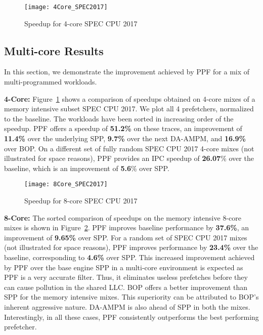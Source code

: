 \begin{figure}[ht]
\texttt{[image: 4Core\_SPEC2017]}
\caption{Speedup for 4-core SPEC CPU 2017}
\label{Fig:4Core_SPEC2017}
\end{figure}

\subsection{Multi-core Results}
\label{Results-Multi}
In this section, we demonstrate the improvement achieved by PPF for a
mix of multi-programmed workloads.

\noindent \textbf{4-Core:} Figure~\ref{Fig:4Core_SPEC2017}
shows a comparison of speedups obtained on 4-core mixes of a memory
intensive subset SPEC CPU 2017. We plot all 4 prefetchers, normalized
to the baseline. The workloads have been sorted in increasing order of
the speedup. PPF offers a speedup of \textbf{51.2\%} on these traces,
an improvement of \textbf{11.4\%} over the underlying SPP,
\textbf{9.7\%} over the next DA-AMPM, and \textbf{16.9\%} over BOP.
On a different set of fully random SPEC CPU 2017 4-core mixes (not
illustrated for space reasons), PPF provides an IPC speedup of
\textbf{26.07}\% over the
baseline, which is an improvement of \textbf{5.6}\% over SPP.

\begin{figure}[ht]
\texttt{[image: 8Core\_SPEC2017]}
\caption{Speedup for 8-core SPEC CPU 2017}
\label{Fig:8Core_SPEC2017}
\end{figure}

\noindent \textbf{8-Core:} The sorted comparison of speedups on the
memory intensive 8-core mixes is shown in
Figure~\ref{Fig:8Core_SPEC2017}.  PPF improves baseline performance by
\textbf{37.6\%}, an improvement of \textbf{9.65\%} over SPP. For a
random set of SPEC CPU 2017 mixes (not illustrated for space reasons),
PPF improves performance by \textbf{23.4\%} over the baseline,
corresponding to \textbf{4.6\%} over SPP. This increased improvement
achieved by PPF over the base engine SPP in a multi-core environment
is expected as PPF is a very accurate filter. Thus, it eliminates
useless prefetches before they can cause pollution in the shared LLC.
BOP offers a better improvement than SPP for the memory intensive
mixes. This superiority can be attributed to BOP's inherent aggressive
nature. DA-AMPM is also ahead of SPP in both the mixes. Interestingly,
in all these cases, PPF consistently outperforms the best performing
prefetcher.

